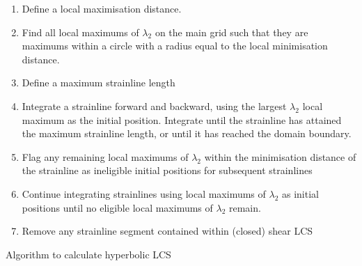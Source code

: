 \documentclass{article}
\begin{document}
\begin{table}
\begin{enumerate}
\item Define a local maximisation distance.
\item Find all local maximums of $\lambda_2$ on the main grid such that they are maximums within a circle with a radius equal to the local minimisation distance.
\item Define a maximum strainline length
\item Integrate a strainline forward and backward, using the largest $\lambda_2$ local maximum as the initial position. Integrate until the strainline has attained the maximum strainline length, or until it has reached the domain boundary.
\item Flag any remaining local maximums of $\lambda_2$ within the minimisation distance of the strainline as ineligible initial positions for subsequent strainlines
\item Continue integrating strainlines using local maximums of $\lambda_2$ as initial positions until no eligible local maximums of $\lambda_2$ remain.
\item Remove any strainline segment contained within (closed) shear LCS
\end{enumerate}
\caption{Algorithm to calculate hyperbolic LCS}
\label{t:Hyperbolic LCS algorithm}
\end{table}
\end{document}
